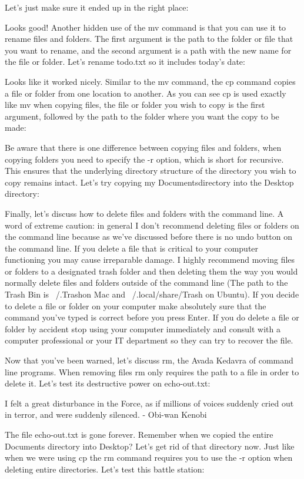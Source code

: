 Let’s just make sure it ended up in the right place:

Looks good! Another hidden use of the mv command is that you can use it to rename files and folders. The first argument is the path to the folder or file that you want to rename, and the second argument is a path with the new name for the file or folder. Let’s rename todo.txt so it includes today’s date:

Looks like it worked nicely. Similar to the mv command, the cp command copies a file or folder from one location to another. As you can see cp is used exactly like mv when copying files, the file or folder you wish to copy is the first argument, followed by the path to the folder where you want the copy to be made:

Be aware that there is one difference between copying files and folders, when copying folders you need to specify the -r option, which is short for recursive. This ensures that the underlying directory structure of the directory you wish to copy remains intact. Let’s try copying my Documentsdirectory into the Desktop directory:

Finally, let’s discuss how to delete files and folders with the command line. A word of extreme caution: in general I don’t recommend deleting files or folders on the command line because as we’ve discussed before there is no undo button on the command line. If you delete a file that is critical to your computer functioning you may cause irreparable damage. I highly recommend moving files or folders to a designated trash folder and then deleting them the way you would normally delete files and folders outside of the command line (The path to the Trash Bin is ~/.Trashon Mac and ~/.local/share/Trash on Ubuntu). If you decide to delete a file or folder on your computer make absolutely sure that the command you’ve typed is correct before you press Enter. If you do delete a file or folder by accident stop using your computer immediately and consult with a computer professional or your IT department so they can try to recover the file.

Now that you’ve been warned, let’s discuss rm, the Avada Kedavra of command line programs. When removing files rm only requires the path to a file in order to delete it. Let’s test its destructive power on echo-out.txt:

I felt a great disturbance in the Force, as if millions of voices suddenly cried out in terror, and were suddenly silenced. - Obi-wan Kenobi

The file echo-out.txt is gone forever. Remember when we copied the entire Documents directory into Desktop? Let’s get rid of that directory now. Just like when we were using cp the rm command requires you to use the -r option when deleting entire directories. Let’s test this battle station:

